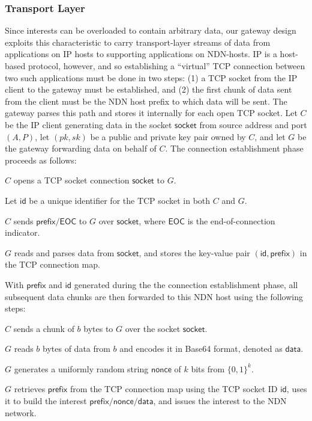 \subsubsection{Transport Layer} %
Since interests can be overloaded to contain arbitrary data, our gateway design exploits this characteristic to carry transport-layer streams of data from applications on IP hosts to supporting applications on NDN-hosts. IP is a host-based protocol, however, and so establishing a ``virtual'' TCP connection between two such applications must be done in two steps: (1) a TCP socket from the IP client to the gateway must be established, and (2) the first chunk of data sent from the client must be the NDN host prefix to which data will be sent. The gateway parses this path and stores it internally for each open TCP socket. Let $C$ be the IP client generating data in the socket $\mathsf{socket}$ from source address and port $(A, P)$, let $(pk,sk)$ be a public and private key pair owned by $C$, and let $G$ be the gateway forwarding data on behalf of $C$. The connection establishment phase proceeds as follows:
%
\begin{compactenum}
	\item $C$ opens a TCP socket connection $\mathsf{socket}$ to $G$. \item Let $\mathsf{id}$ be a unique identifier for the TCP socket in both $C$ and $G$.
	\item $C$ sends $\mathsf{prefix}/\mathsf{EOC}$ to $G$ over $\mathsf{socket}$, where $\mathsf{EOC}$ is the end-of-connection indicator.
	\item $G$ reads and parses data from $\mathsf{socket}$, and stores the key-value pair $(\mathsf{id}, \mathsf{prefix})$ in the TCP connection map.
\end{compactenum}
%
With $\mathsf{prefix}$ and $\mathsf{id}$ generated during the the connection establishment phase, all subsequent data chunks are then forwarded to this NDN host using the following steps:
%
\begin{compactenum}
	\item $C$ sends a chunk of $b$ bytes to $G$ over the socket $\mathsf{socket}$.
	\item $G$ reads $b$ bytes of data from $b$ and encodes it in Base64 format, denoted as $\mathsf{data}$.
	\item $G$ generates a uniformly random string $\mathsf{nonce}$ of $k$ bits from $\{0,1\}^k$. 
	\item $G$ retrieves $\mathsf{prefix}$ from the TCP connection map using the TCP socket ID $\mathsf{id}$, uses it to build the interest $\mathsf{prefix}/\mathsf{nonce}/\mathsf{data}$, and issues the interest to the NDN network.
\end{compactenum}
